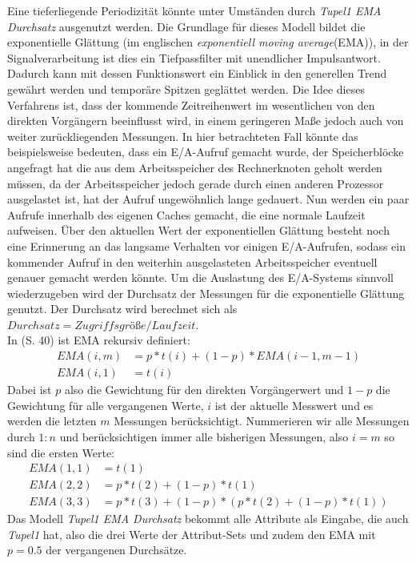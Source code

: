 \documentclass[
	12pt,
	a4paper,
	BCOR10mm,
	DIV14,
	listof=totoc,
	bibliography=totoc,
	headsepline
]{scrreprt}
\begin{document}
Eine tieferliegende Periodizität könnte unter Umständen durch \textit{Tupel1 EMA Durchsatz} ausgenutzt werden. Die Grundlage für dieses Modell bildet die exponentielle Glättung (im englischen \textit{exponentiell moving average}(EMA)), in der Signalverarbeitung ist dies ein Tiefpassfilter mit unendlicher Impulsantwort. Dadurch kann mit dessen Funktionswert ein Einblick in den generellen Trend gewährt werden und temporäre Spitzen geglättet werden. Die Idee dieses Verfahrens ist, dass der kommende Zeitreihenwert im wesentlichen von den direkten Vorgängern beeinflusst wird, in einem geringeren Maße jedoch auch von weiter zurückliegenden Messungen. In hier betrachteten Fall könnte das beispielsweise bedeuten, dass ein E/A-Aufruf gemacht wurde, der Speicherblöcke angefragt hat die aus dem Arbeitsspeicher des Rechnerknoten geholt werden müssen, da der Arbeitsspeicher jedoch gerade durch einen anderen Prozessor ausgelastet ist, hat der Aufruf ungewöhnlich lange gedauert. Nun werden ein paar Aufrufe innerhalb des eigenen Caches gemacht, die eine normale Laufzeit aufweisen. Über den aktuellen Wert der exponentiellen Glättung besteht noch eine Erinnerung an das langsame Verhalten vor einigen E/A-Aufrufen, sodass ein kommender Aufruf in den weiterhin ausgelasteten Arbeitsspeicher eventuell genauer gemacht werden könnte.
Um die Auslastung des E/A-Systems sinnvoll wiederzugeben wird der Durchsatz der Messungen für die exponentielle Glättung genutzt. Der Durchsatz wird berechnet sich als $Durchsatz = Zugriffsgrö\text{ß}e / Laufzeit$.\\
In \cite{kantardzic2011data} (S. 40) ist EMA rekursiv definiert:
\begin{align*}
	EMA(i,m) &= p*t(i)+(1-p)*EMA(i-1,m-1)\\
	EMA(i,1) &= t(i)
\end{align*}
Dabei ist $p$ also die Gewichtung für den direkten Vorgängerwert und $1-p$ die Gewichtung für alle vergangenen Werte, $i$ ist der aktuelle Messwert und es werden die letzten $m$ Messungen berücksichtigt. Nummerieren wir alle Messungen durch $1:n$ und berücksichtigen immer alle bisherigen Messungen, also $i = m$ so sind die ersten Werte:
\begin{align*}
EMA(1,1) &= t(1)\\
EMA(2,2) &=  p*t(2)+(1-p)*t(1)\\
EMA(3,3) &=  p*t(3)+(1-p)*(p*t(2)+(1-p)*t(1))
\end{align*}
Das Modell \textit{Tupel1 EMA Durchsatz} bekommt alle Attribute als Eingabe, die auch \textit{Tupel1} hat, also die drei Werte der Attribut-Sets und zudem den EMA mit $p=0.5$ der vergangenen Durchsätze.
\end{document}
